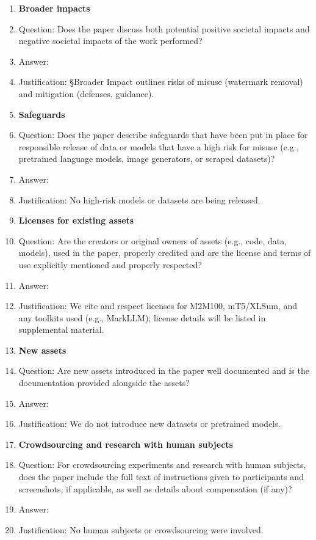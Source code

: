 \documentclass{article}
\begin{document}
\begin{enumerate}
\item {\bf Broader impacts}
    \item[] Question: Does the paper discuss both potential positive societal impacts and negative societal impacts of the work performed?
    \item[] Answer: \answerYes{}
    \item[] Justification: §Broader Impact outlines risks of misuse (watermark removal) and mitigation (defenses, guidance).
\item {\bf Safeguards}
    \item[] Question: Does the paper describe safeguards that have been put in place for responsible release of data or models that have a high risk for misuse (e.g., pretrained language models, image generators, or scraped datasets)?
    \item[] Answer: \answerNA{}
    \item[] Justification: No high‑risk models or datasets are being released.

\item {\bf Licenses for existing assets}
    \item[] Question: Are the creators or original owners of assets (e.g., code, data, models), used in the paper, properly credited and are the license and terms of use explicitly mentioned and properly respected?
    \item[] Answer: \answerYes{}
    \item[] Justification: We cite and respect licenses for M2M100, mT5/XLSum, and any toolkits used (e.g., MarkLLM); license details will be listed in supplemental material.

\item {\bf New assets}
    \item[] Question: Are new assets introduced in the paper well documented and is the documentation provided alongside the assets?
    \item[] Answer: \answerNA{}
    \item[] Justification: We do not introduce new datasets or pretrained models.

\item {\bf Crowdsourcing and research with human subjects}
    \item[] Question: For crowdsourcing experiments and research with human subjects, does the paper include the full text of instructions given to participants and screenshots, if applicable, as well as details about compensation (if any)? 
    \item[] Answer: \answerNA{}
    \item[] Justification: No human subjects or crowdsourcing were involved.


\end{enumerate}
\end{document}
